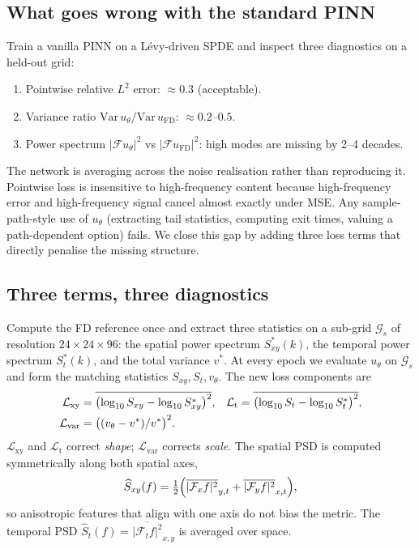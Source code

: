 \documentclass[review,12pt]{elsarticle}
\begin{document}
\subsection{What goes wrong with the standard PINN}

Train a vanilla PINN on a L\'evy-driven SPDE and inspect three
diagnostics on a held-out grid:
\begin{enumerate}
\item Pointwise relative \(L^2\) error: \(\approx 0.3\) (acceptable).
\item Variance ratio
\(\mathrm{Var}\,u_\theta / \mathrm{Var}\,u_{\mathrm{FD}}\):
\(\approx 0.2\)--\(0.5\).
\item Power spectrum \(|\mathcal F u_\theta|^2\) vs
\(|\mathcal F u_{\mathrm{FD}}|^2\): high modes are missing by 2--4
decades.
\end{enumerate}
The network is averaging across the noise realisation rather than
reproducing it. Pointwise loss is insensitive to high-frequency
content because high-frequency error and high-frequency signal
cancel almost exactly under MSE. Any sample-path-style use of
\(u_\theta\) (extracting tail statistics, computing exit times,
valuing a path-dependent option) fails. We close this gap by
adding three loss terms that directly penalise the missing
structure.

\subsection{Three terms, three diagnostics}
\label{subsec:losses}

Compute the FD reference once and extract three statistics on a
sub-grid \(\mathcal{G}_s\) of resolution \(24 \times 24 \times 96\):
the spatial power spectrum \(S^*_{xy}(k)\), the temporal power
spectrum \(S^*_t(k)\), and the total variance \(v^*\). At every epoch
we evaluate \(u_\theta\) on \(\mathcal{G}_s\) and form the matching
statistics \(S_{xy}, S_t, v_\theta\). The new loss components are
\begin{align}
\mathcal{L}_{\mathrm{xy}} &=
\overline{\bigl(\log_{10}S_{xy} - \log_{10}S^*_{xy}\bigr)^2}, &
\mathcal{L}_{\mathrm{t}} &=
\overline{\bigl(\log_{10}S_t - \log_{10}S^*_t\bigr)^2}, \notag\\
\mathcal{L}_{\mathrm{var}} &= \bigl((v_\theta - v^*)/v^*\bigr)^2.
\label{eq:losses}
\end{align}
\(\mathcal{L}_{\mathrm{xy}}\) and \(\mathcal{L}_{\mathrm{t}}\)
correct \emph{shape}; \(\mathcal{L}_{\mathrm{var}}\) corrects
\emph{scale}. The spatial PSD is computed symmetrically along both
spatial axes,
\begin{equation}
\widehat S_{xy}(f) = \tfrac12
\Bigl(\overline{|\mathcal F_x f|^2}_{y,t}
+ \overline{|\mathcal F_y f|^2}_{x,t}\Bigr),
\end{equation}
so anisotropic features that align with one axis do not bias the
metric. The temporal PSD
\(\widehat S_t(f) = \overline{|\mathcal F_t f|^2}_{x,y}\) is
averaged over space.
\end{document}
